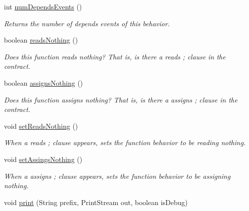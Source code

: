 \begin{DoxyCompactItemize}
int \hyperlink{classedu_1_1udel_1_1cis_1_1vsl_1_1civl_1_1model_1_1common_1_1contract_1_1CommonFunctionBehavior_a96ee68a47842985d73d7b22e290ee409}{num\+Depends\+Events} ()
\begin{DoxyCompactList}\small\item\em Returns the number of depends events of this behavior. \end{DoxyCompactList}\item 
boolean \hyperlink{classedu_1_1udel_1_1cis_1_1vsl_1_1civl_1_1model_1_1common_1_1contract_1_1CommonFunctionBehavior_a1e38c5d9d4d0aa0aadd803bf72b70a75}{reads\+Nothing} ()
\begin{DoxyCompactList}\small\item\em Does this function reads nothing? That is, is there a {\ttfamily reads ;} clause in the contract. \end{DoxyCompactList}\item 
boolean \hyperlink{classedu_1_1udel_1_1cis_1_1vsl_1_1civl_1_1model_1_1common_1_1contract_1_1CommonFunctionBehavior_a71fc0d174c68adfe4fba8e2ab7a76fe9}{assigns\+Nothing} ()
\begin{DoxyCompactList}\small\item\em Does this function assigns nothing? That is, is there a {\ttfamily assigns ;} clause in the contract. \end{DoxyCompactList}\item 
void \hyperlink{classedu_1_1udel_1_1cis_1_1vsl_1_1civl_1_1model_1_1common_1_1contract_1_1CommonFunctionBehavior_a01b38aa4f43c06985f84f33efd95b597}{set\+Reads\+Nothing} ()
\begin{DoxyCompactList}\small\item\em When a {\ttfamily reads ;} clause appears, sets the function behavior to be reading nothing. \end{DoxyCompactList}\item 
void \hyperlink{classedu_1_1udel_1_1cis_1_1vsl_1_1civl_1_1model_1_1common_1_1contract_1_1CommonFunctionBehavior_adae24a5d26a46c2a81190cf0b728f8d0}{set\+Assings\+Nothing} ()
\begin{DoxyCompactList}\small\item\em When a {\ttfamily assigns ;} clause appears, sets the function behavior to be assigning nothing. \end{DoxyCompactList}\item 
void \hyperlink{classedu_1_1udel_1_1cis_1_1vsl_1_1civl_1_1model_1_1common_1_1contract_1_1CommonFunctionBehavior_af5a865f41e4abda9ae0dc97ffb7bf3f3}{print} (String prefix, Print\+Stream out, boolean is\+Debug)

\end{DoxyCompactItemize}
